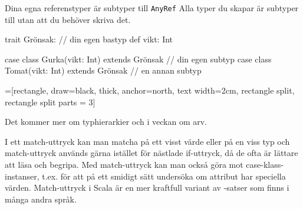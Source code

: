 \begin{Slide}{Dina egna referenstyper är subtyper till \texttt{AnyRef}}\SlideFontSmall
Alla typer du skapar är subtyper till  utan att du behöver skriva det.
\begin{Code}
trait Grönsak:                                 // din egen bastyp
  def vikt: Int

case class Gurka(vikt: Int) extends Grönsak    // din egen subtyp
case class Tomat(vikt: Int) extends Grönsak    // en annan subtyp
\end{Code}
\SlideFontSmall\ifkompendium\footnotesize\fi
\vspace{-0.0em}\begin{center}
\newcommand{\TextBox}[1]{\raisebox{0pt}[1em][0.5em]{#1}}
=[rectangle, draw=black,  thick, anchor=north, text width=2cm, rectangle split, rectangle split parts = 3]
\end{center}
Det kommer mer om typhierarkier och  i veckan om arv.
\end{Slide}


\ifkompendium
\noindent  I ett match-uttryck kan man matcha på ett visst värde eller på en viss typ och match-uttryck används gärna istället för nästlade if-uttryck, då de ofta är lättare att läsa och begripa. Med match-uttryck kan man också göra  mot case-klass-instanser, t.ex. för att på ett smidigt sätt undersöka om attribut har speciella värden. Match-uttryck i Scala är en mer kraftfull variant av -satser som finns i många andra språk.  
\fi

